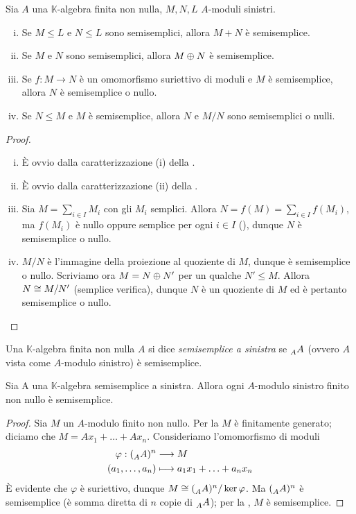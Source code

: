 \begin{proposition}
Sia $A$ una $\mathbb{K}$-algebra finita non nulla, $M,N,L$ $A$-moduli sinistri.
\begin{enumerate}[(i)]
\item Se $M\le L$ e $N\le L$ sono semisemplici, allora $M+N$ è semisemplice.
\item Se $M$ e $N$ sono semisemplici, allora $M\oplus N$ è semisemplice.
\item Se $f:M\to N$ è un omomorfismo suriettivo di moduli e $M$ è semisemplice, allora $N$ è semisemplice o nullo.
\item Se $N\le M$ e $M$ è semisemplice, allora $N$ e $M/N$ sono semisemplici o nulli.
\end{enumerate}
\end{proposition}
\begin{proof}
\leavevmode
\begin{enumerate}[(i)]
\item È ovvio dalla caratterizzazione (i) della .
\item È ovvio dalla caratterizzazione (ii) della .
\item Sia $M=\sum_{i\in I}M_i$ con gli $M_i$ semplici. Allora $N=f(M)=\sum_{i\in I}f(M_i)$, ma $f(M_i)$ è nullo oppure semplice per ogni $i\in I$ (), dunque $N$ è semisemplice o nullo.
\item $M/N$ è l'immagine della proiezione al quoziente di $M$, dunque è semisemplice o nullo. Scriviamo ora $M=N\oplus N'$ per un qualche $N'\le M$. Allora $N\cong M/N'$ (semplice verifica), dunque $N$ è un quoziente di $M$ ed è pertanto semisemplice o nullo.
\end{enumerate}
\end{proof}


\begin{definition}
Una $\mathbb{K}$-algebra finita non nulla $A$ si dice \emph{semisemplice a sinistra} se $\prescript{}{A}{A}$ (ovvero $A$ vista come $A$-modulo sinistro) è semisemplice.
\end{definition}


\begin{proposition}
Sia A una $\mathbb{K}$-algebra semisemplice a sinistra. Allora ogni $A$-modulo sinistro finito non nullo è semisemplice.
\end{proposition}
\begin{proof}
Sia $M$ un $A$-modulo finito non nullo. Per la  $M$ è finitamente generato; diciamo che $M=Ax_1+\ldots+Ax_n$. Consideriamo l'omomorfismo di moduli
\begin{align*}
\varphi:(\prescript{}{A}{A})^n&\longrightarrow M\\
(a_1,\ldots,a_n)&\longmapsto a_1x_1+\ldots+a_nx_n
\end{align*}
È evidente che $\varphi$ è suriettivo, dunque $M\cong (\prescript{}{A}{A})^n/\ker\varphi$. Ma $(\prescript{}{A}{A})^n$ è semisemplice (è somma diretta di $n$ copie di $\prescript{}{A}{A}$); per la , $M$ è semisemplice.
\end{proof}


